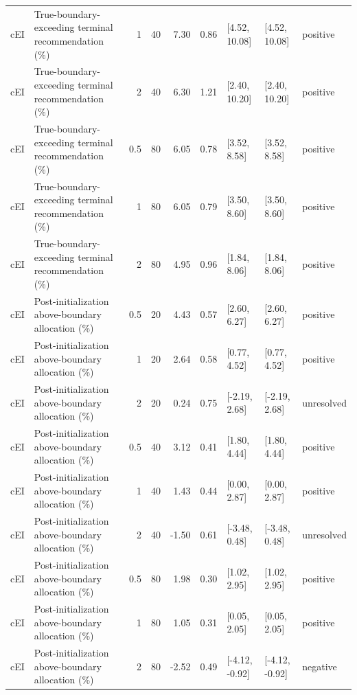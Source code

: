 \begin{longtable}{p{1.8cm}p{3.0cm}rrrrp{2.6cm}p{2.6cm}p{1.6cm}}
cEI & True-boundary-exceeding terminal recommendation (\%) & 1 & 40 & 7.30 & 0.86 & [4.52, 10.08] & [4.52, 10.08] & positive \\
cEI & True-boundary-exceeding terminal recommendation (\%) & 2 & 40 & 6.30 & 1.21 & [2.40, 10.20] & [2.40, 10.20] & positive \\
cEI & True-boundary-exceeding terminal recommendation (\%) & 0.5 & 80 & 6.05 & 0.78 & [3.52, 8.58] & [3.52, 8.58] & positive \\
cEI & True-boundary-exceeding terminal recommendation (\%) & 1 & 80 & 6.05 & 0.79 & [3.50, 8.60] & [3.50, 8.60] & positive \\
cEI & True-boundary-exceeding terminal recommendation (\%) & 2 & 80 & 4.95 & 0.96 & [1.84, 8.06] & [1.84, 8.06] & positive \\
cEI & Post-initialization above-boundary allocation (\%) & 0.5 & 20 & 4.43 & 0.57 & [2.60, 6.27] & [2.60, 6.27] & positive \\
cEI & Post-initialization above-boundary allocation (\%) & 1 & 20 & 2.64 & 0.58 & [0.77, 4.52] & [0.77, 4.52] & positive \\
cEI & Post-initialization above-boundary allocation (\%) & 2 & 20 & 0.24 & 0.75 & [-2.19, 2.68] & [-2.19, 2.68] & unresolved \\
cEI & Post-initialization above-boundary allocation (\%) & 0.5 & 40 & 3.12 & 0.41 & [1.80, 4.44] & [1.80, 4.44] & positive \\
cEI & Post-initialization above-boundary allocation (\%) & 1 & 40 & 1.43 & 0.44 & [0.00, 2.87] & [0.00, 2.87] & positive \\
cEI & Post-initialization above-boundary allocation (\%) & 2 & 40 & -1.50 & 0.61 & [-3.48, 0.48] & [-3.48, 0.48] & unresolved \\
cEI & Post-initialization above-boundary allocation (\%) & 0.5 & 80 & 1.98 & 0.30 & [1.02, 2.95] & [1.02, 2.95] & positive \\
cEI & Post-initialization above-boundary allocation (\%) & 1 & 80 & 1.05 & 0.31 & [0.05, 2.05] & [0.05, 2.05] & positive \\
cEI & Post-initialization above-boundary allocation (\%) & 2 & 80 & -2.52 & 0.49 & [-4.12, -0.92] & [-4.12, -0.92] & negative \\
\bottomrule
\end{longtable}
